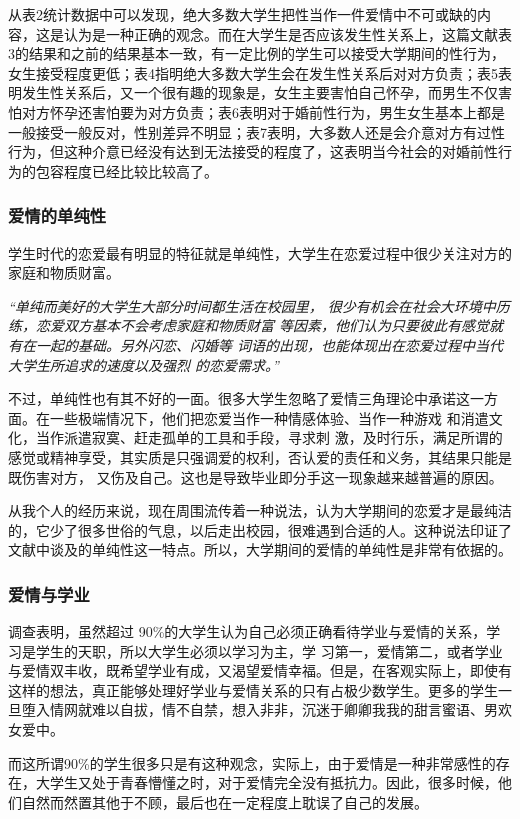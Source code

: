 \documentclass[UTF8,a4paper]{ctexart}
\begin{document}
从表2统计数据中可以发现，绝大多数大学生把性当作一件爱情中不可或缺的内容，这是认为是一种正确的观念。而在大学生是否应该发生性关系上，这篇文献表3的结果和之前的结果基本一致，有一定比例的学生可以接受大学期间的性行为，女生接受程度更低；表4指明绝大多数大学生会在发生性关系后对对方负责；表5表明发生性关系后，又一个很有趣的现象是，女生主要害怕自己怀孕，而男生不仅害怕对方怀孕还害怕要为对方负责；表6表明对于婚前性行为，男生女生基本上都是一般接受一般反对，性别差异不明显；表7表明，大多数人还是会介意对方有过性行为，但这种介意已经没有达到无法接受的程度了，这表明当今社会的对婚前性行为的包容程度已经比较比较高了。

\subsubsection{爱情的单纯性}
学生时代的恋爱最有明显的特征就是单纯性，大学生在恋爱过程中很少关注对方的家庭和物质财富。

\textit{
“单纯而美好的大学生大部分时间都生活在校园里， 很少有机会在社会大环境中历练，恋爱双方基本不会考虑家庭和物质财富 等因素，他们认为只要彼此有感觉就有在一起的基础。另外闪恋、闪婚等 词语的出现，也能体现出在恋爱过程中当代大学生所追求的速度以及强烈 的恋爱需求。”}

不过，单纯性也有其不好的一面。很多大学生忽略了爱情三角理论中承诺这一方面。在一些极端情况下，他们把恋爱当作一种情感体验、当作一种游戏 和消遣文化，当作派遣寂寞、赶走孤单的工具和手段，寻求刺 激，及时行乐，满足所谓的感觉或精神享受，其实质是只强调爱的权利，否认爱的责任和义务，其结果只能是既伤害对方， 又伤及自己。这也是导致毕业即分手这一现象越来越普遍的原因。

从我个人的经历来说，现在周围流传着一种说法，认为大学期间的恋爱才是最纯洁的，它少了很多世俗的气息，以后走出校园，很难遇到合适的人。这种说法印证了文献中谈及的单纯性这一特点。所以，大学期间的爱情的单纯性是非常有依据的。

\subsubsection{爱情与学业}
调查表明，虽然超过 90\%的大学生认为自己必须正确看待学业与爱情的关系，学习是学生的天职，所以大学生必须以学习为主，学
习第一，爱情第二，或者学业与爱情双丰收，既希望学业有成，又渴望爱情幸福。但是，在客观实际上，即使有这样的想法，真正能够处理好学业与爱情关系的只有占极少数学生。更多的学生一旦堕入情网就难以自拔，情不自禁，想入非非，沉迷于卿卿我我的甜言蜜语、男欢女爱中。

而这所谓90\%的学生很多只是有这种观念，实际上，由于爱情是一种非常感性的存在，大学生又处于青春懵懂之时，对于爱情完全没有抵抗力。因此，很多时候，他们自然而然置其他于不顾，最后也在一定程度上耽误了自己的发展。
\end{document}
